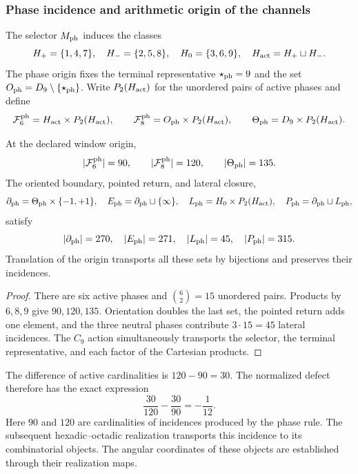 \subsubsection{Phase incidence and arithmetic origin of the channels}

The selector \(M_{\rm ph}\) induces the classes
\[
 H_+=\{1,4,7\},\quad H_-=\{2,5,8\},\quad
 H_0=\{3,6,9\},\quad H_{\rm act}=H_+\sqcup H_-.
\]
The phase origin fixes the terminal representative
\(\star_{\rm ph}=9\) and the set
\(O_{\rm ph}=D_9\setminus\{\star_{\rm ph}\}\).
Write \(P_2(H_{\rm act})\) for the unordered pairs of active
phases and define
\[
 \mathcal F_6^{\rm ph}=H_{\rm act}\times P_2(H_{\rm act}),\qquad
 \mathcal F_8^{\rm ph}=O_{\rm ph}\times P_2(H_{\rm act}),\qquad
 \Theta_{\rm ph}=D_9\times P_2(H_{\rm act}).
\]

\begin{theorem}
\label{ii:ii:tpk-semicorona}
At the declared window origin,
\[
 |\mathcal F_6^{\rm ph}|=90,\qquad
 |\mathcal F_8^{\rm ph}|=120,\qquad
 |\Theta_{\rm ph}|=135.
\]
The oriented boundary, pointed return, and lateral closure,
\[
 \partial_{\rm ph}=\Theta_{\rm ph}\times\{-1,+1\},\quad
 E_{\rm ph}=\partial_{\rm ph}\sqcup\{\infty\},\quad
 L_{\rm ph}=H_0\times P_2(H_{\rm act}),\quad
 P_{\rm ph}=\partial_{\rm ph}\sqcup L_{\rm ph},
\]
satisfy
\[
 |\partial_{\rm ph}|=270,\quad |E_{\rm ph}|=271,\quad
 |L_{\rm ph}|=45,\quad |P_{\rm ph}|=315.
\]
Translation of the origin transports all these sets by bijections
and preserves their incidences.
\end{theorem}
\begin{proof}
There are six active phases and \(\binom62=15\) unordered pairs.
Products by \(6,8,9\) give \(90,120,135\). Orientation
doubles the last set, the pointed return adds one element, and the
three neutral phases contribute \(3\cdot15=45\) lateral incidences.
The \(C_9\) action simultaneously transports the selector, the
terminal representative, and each factor of the Cartesian products.
\end{proof}

The difference of active cardinalities is \(120-90=30\). The normalized
defect therefore has the exact expression
\begin{equation}
 \frac{30}{120}-\frac{30}{90}=-\frac1{12}.
 \label{ii:ii:tpk-defecto-incidencia}
\end{equation}
Here \(90\) and \(120\) are cardinalities of incidences produced by the
phase rule. The subsequent hexadic--octadic realization transports this
incidence to its combinatorial objects. The angular coordinates of these
objects are established through their realization maps.

